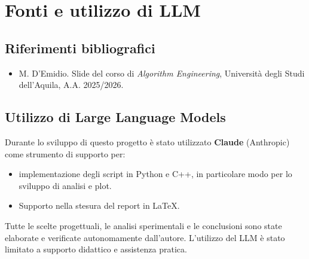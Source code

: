 \documentclass[12pt, a4paper]{article}
\begin{document}
\section{Fonti e utilizzo di LLM}

\subsection*{Riferimenti bibliografici}

\begin{itemize}
    \item M. D'Emidio. Slide del corso di 
    \textit{Algorithm Engineering}, 
    Universit\`a degli Studi dell'Aquila, A.A. 2025/2026.
\end{itemize}

\subsection*{Utilizzo di Large Language Models}

Durante lo sviluppo di questo progetto \`e stato utilizzato 
\textbf{Claude} (Anthropic) come strumento di supporto per:

\begin{itemize}
    \item implementazione degli script
    in Python e C++, in particolare modo per lo sviluppo di analisi e plot.
    
    \item Supporto nella stesura del report in \LaTeX.
\end{itemize}

Tutte le scelte progettuali, le analisi sperimentali e le conclusioni 
sono state elaborate e verificate autonomamente dall'autore. 
L'utilizzo del LLM \`e stato limitato a supporto didattico 
e assistenza pratica.
\end{document}
